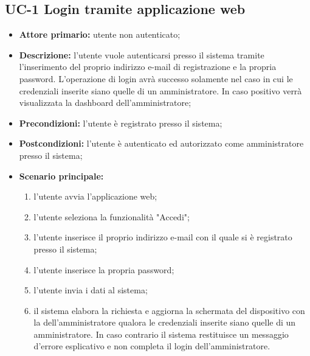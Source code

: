 \subsection{UC-1 Login tramite applicazione web}
\begin{itemize}
	\item \textbf{Attore primario:} utente non autenticato; 

	\item \textbf{Descrizione:} l'utente vuole autenticarsi presso il sistema tramite l'inserimento del proprio indirizzo e-mail di registrazione e la propria password. L'operazione di login avrà successo solamente nel caso in cui le credenziali inserite siano quelle di un amministratore. In caso positivo verrà visualizzata la dashboard dell'amministratore;

	\item \textbf{Precondizioni:} l'utente è registrato presso il sistema;

	\item \textbf{Postcondizioni:} l'utente è autenticato ed autorizzato come amministratore presso il sistema;

	\item \textbf{Scenario principale:}

	      \begin{enumerate}
		      \item l'utente avvia l'applicazione web;
		      \item l'utente seleziona la funzionalità "Accedi";
		      \item l'utente inserisce il proprio indirizzo e-mail con il quale si è registrato presso il sistema;
		      \item l'utente inserisce la propria password;
		      \item l'utente invia i dati al sistema;
		      \item il sistema elabora la richiesta e aggiorna la schermata del dispositivo con la  dell'amministratore qualora le credenziali inserite siano quelle di un amministratore. In caso contrario il sistema restituisce un messaggio d'errore esplicativo e non completa il login dell'amministratore.
	      \end{enumerate}
\end{itemize}

